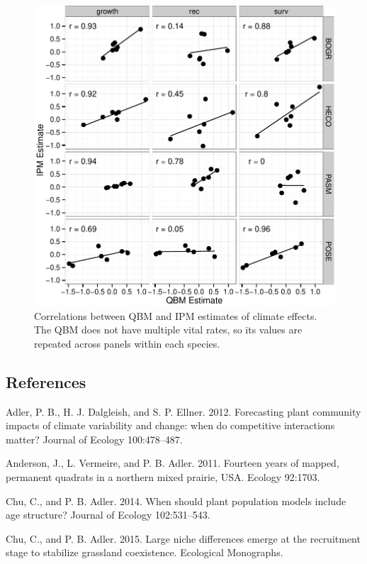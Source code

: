 \documentclass[12pt,]{article}
\begin{document}
\begin{figure}[htbp]
\centering
\includegraphics{components/figure/manuscript-figure_5.pdf}
\caption{Correlations between QBM and IPM estimates of climate effects.
The QBM does not have multiple vital rates, so its values are repeated
across panels within each species.}
\end{figure}

\pagebreak{}

\subsection{References}\label{references}

Adler, P. B., H. J. Dalgleish, and S. P. Ellner. 2012. Forecasting plant
community impacts of climate variability and change: when do competitive
interactions matter? Journal of Ecology 100:478--487.

Anderson, J., L. Vermeire, and P. B. Adler. 2011. Fourteen years of
mapped, permanent quadrats in a northern mixed prairie, USA. Ecology
92:1703.

Chu, C., and P. B. Adler. 2014. When should plant population models
include age structure? Journal of Ecology 102:531--543.

Chu, C., and P. B. Adler. 2015. Large niche differences emerge at the
recruitment stage to stabilize grassland coexistence. Ecological
Monographs.
\end{document}
